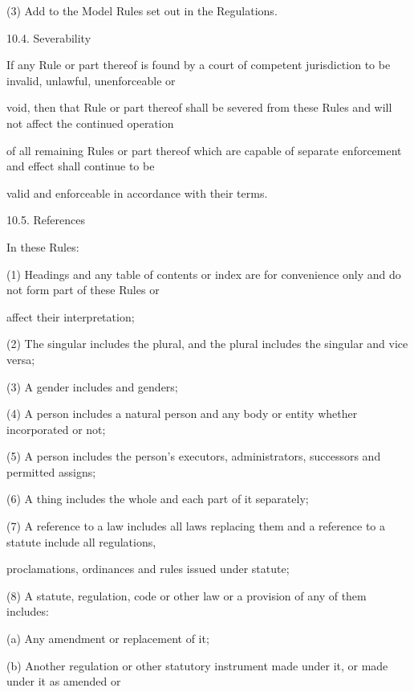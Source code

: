 \documentclass{article}
\begin{document}
{\fontsize{9.962}{1}(3) Add to the Model Rules set out in the Regulations. }

{\fontsize{9.99}{1}10.4. Severability }


{\fontsize{10.02}{1}If any Rule or part thereof is found by a court of competent jurisdiction to be invalid, unlawful, unenforceable or }

{\fontsize{10.02}{1}void, then that Rule or part thereof shall be severed from these Rules and will not affect the continued operation }

{\fontsize{10.02}{1}of all remaining Rules or part thereof which are capable of separate enforcement and effect shall continue to be }

{\fontsize{10.02}{1}valid and enforceable in accordance with their terms. }

{\fontsize{9.99}{1}10.5. References }

{\fontsize{10.02}{1}In these Rules: }

{\fontsize{9.962}{1}(1) Headings and any table of contents or index are for convenience only and do not form part of these Rules or }

{\fontsize{10.02}{1}affect their interpretation; }

{\fontsize{9.962}{1}(2) The singular includes the plural, and the plural includes the singular and vice versa; }

{\fontsize{9.962}{1}(3) A gender includes and genders; }

{\fontsize{9.962}{1}(4) A person includes a natural person and any body or entity whether incorporated or not; }

{\fontsize{9.962}{1}(5) A person includes the person’s executors, administrators, successors and permitted assigns; }

{\fontsize{9.962}{1}(6) A thing includes the whole and each part of it separately; }

{\fontsize{9.962}{1}(7) A reference to a law includes all laws replacing them and a reference to a statute include all regulations, }

{\fontsize{10.02}{1}proclamations, ordinances and rules issued under statute; }

{\fontsize{9.962}{1}(8) A statute, regulation, code or other law or a provision of any of them includes: }

{\fontsize{9.962}{1}(a) Any amendment or replacement of it; }

{\fontsize{9.962}{1}(b) Another regulation or other statutory instrument made under it, or made under it as amended or }
\end{document}
